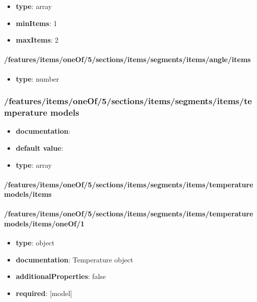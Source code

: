 \begin{itemize}\item {\bf type}: array
\item {\bf minItems}: 1
\item {\bf maxItems}: 2
\end{itemize}\paragraph{/features/items/oneOf/5/sections/items/segments/items/angle/items}
\begin{itemize}\item {\bf type}: number
\end{itemize}\subsubsection{/features/items/oneOf/5/sections/items/segments/items/temperature models}
\begin{itemize}\item {\bf documentation}: 
\item {\bf default value}: 
\item {\bf type}: array
\end{itemize}\paragraph{/features/items/oneOf/5/sections/items/segments/items/temperature models/items}

\paragraph{/features/items/oneOf/5/sections/items/segments/items/temperature models/items/oneOf/1}
\begin{itemize}\item {\bf type}: object
\item {\bf documentation}: Temperature object
\item {\bf additionalProperties}: false
\item {\bf required}: [model]\end{itemize}
